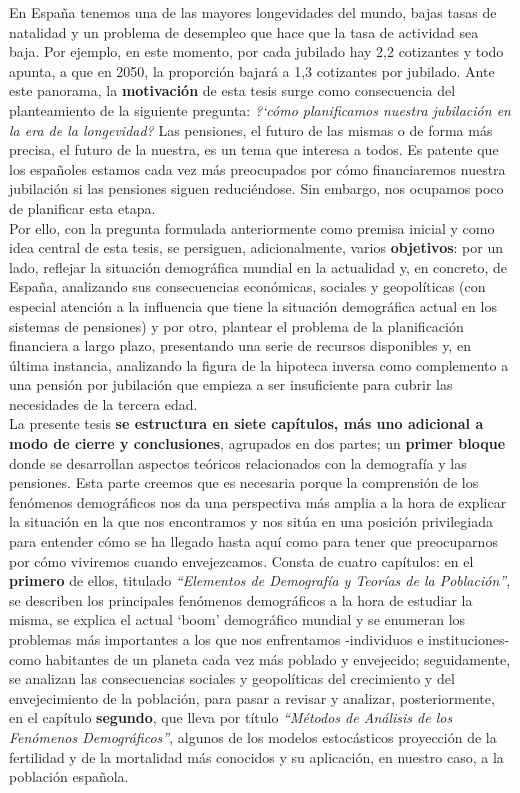 En Espa\~na tenemos una de las mayores longevidades del mundo, bajas tasas de natalidad y un problema de desempleo que hace que la tasa de actividad sea baja. Por ejemplo, en este momento, por cada jubilado hay 2,2 cotizantes y todo apunta, a que en 2050, la proporci\'on bajar\'a a 1,3 cotizantes por jubilado. Ante este panorama, la \textbf{motivaci\'on} de esta tesis surge como consecuencia del planteamiento de la siguiente pregunta: \textit{?`c\'omo planificamos nuestra jubilaci\'on en la era de la longevidad?} Las pensiones, el futuro de las mismas o de forma m\'as precisa, el futuro de la nuestra, es un tema que interesa a todos. Es patente que los espa\~noles estamos cada vez m\'as preocupados por c\'omo financiaremos nuestra jubilaci\'on si las pensiones siguen reduci\'endose. Sin embargo, nos ocupamos poco de planificar esta etapa.\\

Por ello, con la pregunta formulada anteriormente como premisa inicial y como idea central de esta tesis, se persiguen, adicionalmente, varios \textbf{objetivos}: por un lado, reflejar la situaci\'on demogr\'afica mundial en la actualidad y, en concreto, de Espa\~na, analizando sus consecuencias económicas, sociales y geopol\'iticas (con especial atenci\'on a la influencia que tiene la situaci\'on demogr\'afica actual en los sistemas de pensiones) y por otro, plantear el problema de la planificaci\'on financiera a largo plazo, presentando una serie de recursos disponibles y, en última instancia, analizando la figura de la hipoteca inversa como complemento a una pensi\'on por jubilaci\'on que empieza a ser insuficiente para cubrir las necesidades de la tercera edad.\\

La presente tesis \textbf{se estructura en siete cap\'itulos, más uno adicional a modo de cierre y conclusiones}, agrupados en dos partes; un \textbf{primer bloque} donde se desarrollan aspectos te\'oricos relacionados con la demograf\'ia y las pensiones. Esta parte creemos que es necesaria porque la comprensi\'on de los fen\'omenos demogr\'aficos nos da una perspectiva más amplia a la hora de explicar la situaci\'on en la que nos encontramos y nos sitúa en una posición privilegiada para entender c\'omo se ha llegado hasta aqu\'i como para tener que preocuparnos por c\'omo viviremos cuando envejezcamos. Consta de cuatro cap\'itulos: en el \textbf{primero} de ellos, titulado \textit{``Elementos de Demograf\'ia y Teor\'ias de la Poblaci\'on''}, se describen los principales fen\'omenos demogr\'aficos a la hora de estudiar la misma, se explica el actual `boom' demogr\'afico mundial y se enumeran los problemas m\'as importantes a los que nos enfrentamos -individuos e instituciones- como habitantes de un planeta cada vez m\'as poblado y envejecido; seguidamente, se analizan las consecuencias sociales y geopol\'iticas del crecimiento y del envejecimiento de la poblaci\'on, para pasar a revisar y analizar, posteriormente, en el  cap\'itulo \textbf{segundo}, que lleva por título \textit{``Métodos de Análisis de los Fenómenos Demográficos''}, algunos de los modelos estoc\'asticos proyección de la fertilidad y de la mortalidad m\'as conocidos y su aplicación, en nuestro caso, a la población española.\\

